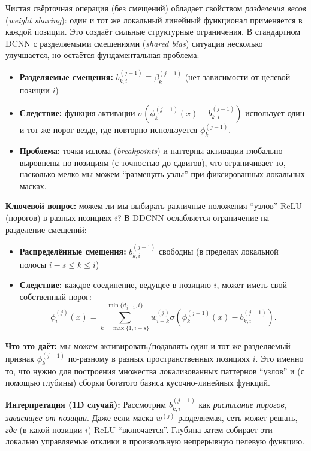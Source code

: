 \documentclass[../NDCNNAI_main.tex]{subfiles}
\begin{document}
Чистая свёрточная операция (без смещений) обладает свойством \emph{разделения весов} (\emph{weight sharing}): один и тот же локальный линейный функционал применяется в каждой позиции.
Это создаёт сильные структурные ограничения. В стандартном DCNN с разделяемыми смещениями (\emph{shared bias}) ситуация несколько улучшается, но остаётся фундаментальная проблема:
\begin{itemize}
    \item \textbf{Разделяемые смещения:} $b_{k,i}^{(j-1)} \equiv \beta_k^{(j-1)}$ (нет зависимости от целевой позиции $i$)
    \item \textbf{Следствие:} функция активации $\sigma\left( \phi_k^{(j-1)}(x) - b_{k,i}^{(j-1)} \right)$ использует один и тот же порог везде, где повторно используется $\phi_k^{(j-1)}$.
    \item \textbf{Проблема:} точки излома (\emph{breakpoints}) и паттерны активации глобально выровнены по позициям (с точностью до сдвигов), что ограничивает то, насколько мелко мы можем ``размещать узлы'' при фиксированных локальных масках.
\end{itemize}

\textbf{Ключевой вопрос:} можем ли мы выбирать различные положения ``узлов'' ReLU (порогов) в разных позициях $i$?
В DDCNN ослабляется ограничение на разделение смещений:
\begin{itemize}
    \item \textbf{Распределённые смещения:} $b_{k,i}^{(j-1)}$ свободны (в пределах локальной полосы $i-s \leq k \leq i$)
    \item \textbf{Следствие:} каждое соединение, ведущее в позицию $i$, может иметь свой собственный порог:
    \[
    \phi_i^{(j)}(x) = \sum_{k=\max\{1, i-s\}}^{\min\{d_{j-1}, i\}} w_{i-k}^{(j)} \sigma\left( \phi_k^{(j-1)}(x) - b_{k,i}^{(j-1)} \right).
    \]
\end{itemize}
\textbf{Что это даёт:} мы можем активировать/подавлять один и тот же разделяемый признак $\phi_k^{(j-1)}$ по-разному в разных пространственных позициях $i$. Это именно то, что нужно для построения множества локализованных паттернов ``узлов'' и (с помощью глубины) сборки богатого базиса кусочно-линейных функций.

\textbf{Интерпретация (1D случай):} Рассмотрим $b_{k,i}^{(j-1)}$ как \emph{расписание порогов, зависящее от позиции}. Даже если маска $w^{(j)}$ разделяемая, сеть может решать, \emph{где} (в какой позиции $i$) ReLU ``включается''. Глубина затем собирает эти локально управляемые отклики в произвольную непрерывную целевую функцию.
\end{document}
